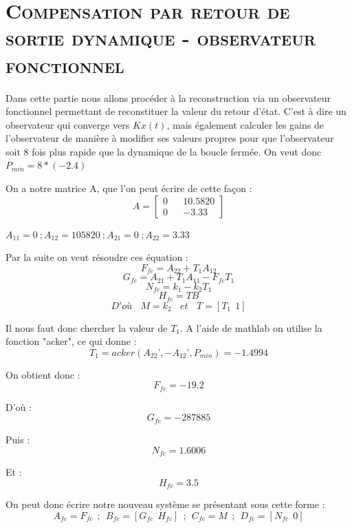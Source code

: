 \chapter{\textsc{Compensation par retour de sortie dynamique - observateur fonctionnel}}
\parindent=1cm 
Dans cette partie nous allons procéder à la reconstruction via un observateur fonctionnel permettant de reconstituer la valeur du retour d'état. C'est à dire un observateur qui converge vers $Kx(t)$, mais également  calculer les gains de l’observateur de manière à modifier ses valeurs propres pour que l’observateur soit 8 fois plus rapide que la dynamique de la boucle fermée. On veut donc $P_{min}=8*(-2.4)$
\par On a notre matrice A, que l'on peut écrire de cette façon :
    $$A = \begin{bmatrix}0 && 10.5820 \\0 && -3.33 \end{bmatrix}$$
\par $A_{11}=0~; A_{12}=105820~; A_{21}=0~; A_{22}=3.33$
\par Par la suite on veut résoudre ces équation : $$F_{fc}=A_{22}+T_1A_{12}$$ 
$$G_{fc} = A_{21} + T_1 A_{11} - F_{fc} T_1$$
$$ N_{fc} = k_1 - k_2T_1$$
$$H_{fc} = T  B$$
$$D'où~~~~M = k_2~~~~et~~~~T = [T_1~~1]$$
\par Il nous faut donc chercher la valeur de $T_1$. A l'aide de mathlab on utilise la fonction "acker", ce qui donne : $$T_1 = acker (A_{22}’,-A_{12}’,P_{min} ) = -1.4994$$
\par On obtient donc : $$F_{fc} = -19.2$$
\par D'où : $$G_{fc} = -287885$$
\par Puis : $$N_{fc} = 1.6006$$
\par Et : $$H_{fc} = 3.5$$
\par On peut donc écrire notre nouveau système se présentant sous cette forme :
$$A_{fc} = F_{fc}~~;~~B_{fc} = [G_{fc}~~H_{fc}]~~;
~~C_{fc} = M~~;~~D_{fc} = [N_{fc}~~0]$$


